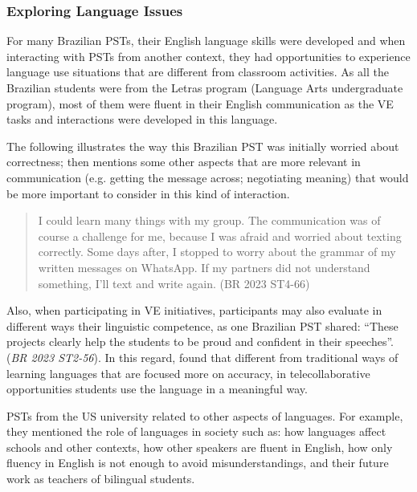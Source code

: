 \subsubsection{Exploring Language Issues}\label{sub-sub-sec-exploring}

For many Brazilian PSTs, their English language skills were developed
and when interacting with PSTs from another context, they had
opportunities to experience language use situations that are different
from classroom activities. As all the Brazilian students were from the
Letras program (Language Arts undergraduate program), most of them were
fluent in their English communication as the VE tasks and interactions
were developed in this language.

The following illustrates the way this Brazilian PST was initially
worried about correctness; then mentions some other aspects that are
more relevant in communication (e.g. getting the message across;
negotiating meaning) that would be more important to consider in this
kind of interaction.

\begin{quote}
I could learn many things with my group. The communication was of
course a challenge for me, because I was afraid and worried about
texting correctly. Some days after, I stopped to worry about the grammar
of my written messages on WhatsApp. If my partners did not understand
something, I’ll text and write again. (BR 2023
ST4-66)
\end{quote}

Also, when participating in VE initiatives, participants may also
evaluate in different ways their linguistic competence, as one Brazilian
PST shared: \enquote{These projects clearly help the students to be proud and confident in their speeches}. (\emph{BR 2023 ST2-56}). In this
regard, \textcite[p. 217]{odowd2021virtual} found that different from
traditional ways of learning languages that are focused more on
accuracy, in telecollaborative opportunities students use the language
in a meaningful way.

PSTs from the US university related to other aspects of languages. For
example, they mentioned the role of languages in society such as: how
languages affect schools and other contexts, how other speakers are
fluent in English, how only fluency in English is not enough to avoid
misunderstandings, and their future work as teachers of bilingual
students.


